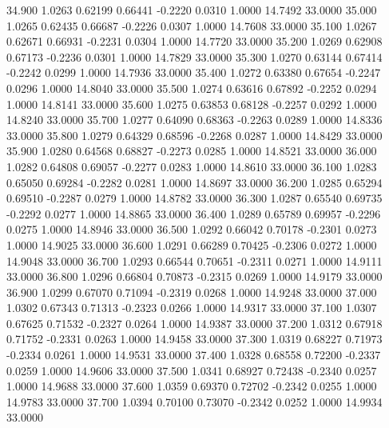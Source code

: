   34.900   1.0263   0.62199   0.66441  -0.2220   0.0310   1.0000  14.7492  33.0000
  35.000   1.0265   0.62435   0.66687  -0.2226   0.0307   1.0000  14.7608  33.0000
  35.100   1.0267   0.62671   0.66931  -0.2231   0.0304   1.0000  14.7720  33.0000
  35.200   1.0269   0.62908   0.67173  -0.2236   0.0301   1.0000  14.7829  33.0000
  35.300   1.0270   0.63144   0.67414  -0.2242   0.0299   1.0000  14.7936  33.0000
  35.400   1.0272   0.63380   0.67654  -0.2247   0.0296   1.0000  14.8040  33.0000
  35.500   1.0274   0.63616   0.67892  -0.2252   0.0294   1.0000  14.8141  33.0000
  35.600   1.0275   0.63853   0.68128  -0.2257   0.0292   1.0000  14.8240  33.0000
  35.700   1.0277   0.64090   0.68363  -0.2263   0.0289   1.0000  14.8336  33.0000
  35.800   1.0279   0.64329   0.68596  -0.2268   0.0287   1.0000  14.8429  33.0000
  35.900   1.0280   0.64568   0.68827  -0.2273   0.0285   1.0000  14.8521  33.0000
  36.000   1.0282   0.64808   0.69057  -0.2277   0.0283   1.0000  14.8610  33.0000
  36.100   1.0283   0.65050   0.69284  -0.2282   0.0281   1.0000  14.8697  33.0000
  36.200   1.0285   0.65294   0.69510  -0.2287   0.0279   1.0000  14.8782  33.0000
  36.300   1.0287   0.65540   0.69735  -0.2292   0.0277   1.0000  14.8865  33.0000
  36.400   1.0289   0.65789   0.69957  -0.2296   0.0275   1.0000  14.8946  33.0000
  36.500   1.0292   0.66042   0.70178  -0.2301   0.0273   1.0000  14.9025  33.0000
  36.600   1.0291   0.66289   0.70425  -0.2306   0.0272   1.0000  14.9048  33.0000
  36.700   1.0293   0.66544   0.70651  -0.2311   0.0271   1.0000  14.9111  33.0000
  36.800   1.0296   0.66804   0.70873  -0.2315   0.0269   1.0000  14.9179  33.0000
  36.900   1.0299   0.67070   0.71094  -0.2319   0.0268   1.0000  14.9248  33.0000
  37.000   1.0302   0.67343   0.71313  -0.2323   0.0266   1.0000  14.9317  33.0000
  37.100   1.0307   0.67625   0.71532  -0.2327   0.0264   1.0000  14.9387  33.0000
  37.200   1.0312   0.67918   0.71752  -0.2331   0.0263   1.0000  14.9458  33.0000
  37.300   1.0319   0.68227   0.71973  -0.2334   0.0261   1.0000  14.9531  33.0000
  37.400   1.0328   0.68558   0.72200  -0.2337   0.0259   1.0000  14.9606  33.0000
  37.500   1.0341   0.68927   0.72438  -0.2340   0.0257   1.0000  14.9688  33.0000
  37.600   1.0359   0.69370   0.72702  -0.2342   0.0255   1.0000  14.9783  33.0000
  37.700   1.0394   0.70100   0.73070  -0.2342   0.0252   1.0000  14.9934  33.0000
